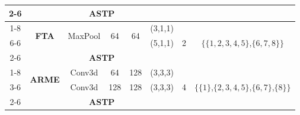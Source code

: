 \begin{enumerate}
\begin{table}[bt]
{\begin{tabular}{c|ccccc|c|c}
                      \cline{2-6}                                                  & \multicolumn{5}{c|}{\textbf{ASTP}}                     &                                                  &                                                                                                                                                                                               \\
                      \cline{1-8}      \multicolumn{1}{c|}{\multirow{3}[1]{*}{2}}  & \multicolumn{1}{c|}{\multirow{2}[1]{*}{\textbf{FTA}}}  & \multicolumn{1}{c|}{\multirow{2}[1]{*}{MaxPool}} & \multicolumn{1}{c|}{\multirow{2}[1]{*}{64}} & \multicolumn{1}{c|}{\multirow{2}[1]{*}{64}} & (3,1,1) & \multirow{3}[1]{*}{2} & \multirow{3}[1]{*}{$\{\{1,2,3,4,5\}$,$\{6,7,8\}\}$}             \\
                      \cline{6-6}                                                  & \multicolumn{1}{c|}{}                         & \multicolumn{1}{c|}{}                            & \multicolumn{1}{c|}{}                       & \multicolumn{1}{c|}{}                       & (5,1,1) &                       &                                                                 \\
                      \cline{2-6}                                                  & \multicolumn{5}{c|}{\textbf{ASTP}}                     &                                                  &                                                                                                                                                                                               \\
                      \cline{1-8}       \multicolumn{1}{c|}{\multirow{3}[1]{*}{3}} & \multicolumn{1}{c|}{\multirow{2}[1]{*}{\textbf{ARME}}} & \multicolumn{1}{c|}{Conv3d}                      & \multicolumn{1}{c|}{64}                     & \multicolumn{1}{c|}{128}                    & (3,3,3) & \multirow{3}[1]{*}{4} & \multirow{3}[1]{*}{$\{\{1\}$,$\{2,3,4,5\}$,$\{6,7\}$,$\{8\}\}$} \\
                      \cline{3-6}                                                  & \multicolumn{1}{c|}{}                         & \multicolumn{1}{c|}{Conv3d}                      & \multicolumn{1}{c|}{128}                    & \multicolumn{1}{c|}{128}                    & (3,3,3) &                       &                                                                 \\
                      \cline{2-6}                                                  & \multicolumn{5}{c|}{\textbf{ASTP}}                     &                                                  &                                                                                                                                                                                               \\

\end{tabular}}
\end{table}
\end{enumerate}
